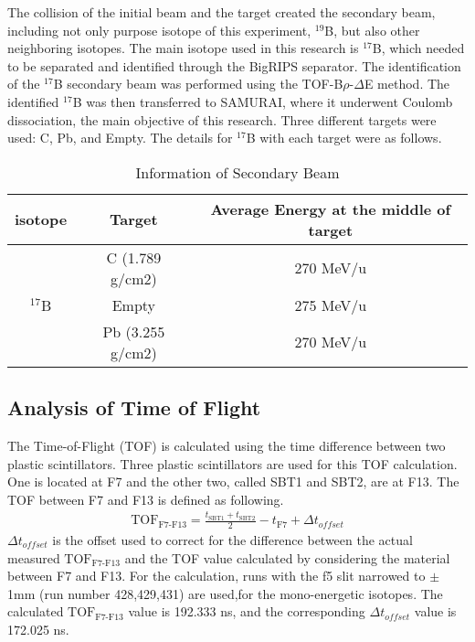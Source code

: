     \indent The collision of the initial beam and the target created the secondary beam, including not only purpose isotope of this experiment, ${}^{19}$B, but also other neighboring isotopes. The main isotope used in this research is ${}^{17}$B, which needed to be separated and identified through the BigRIPS separator. The identification of the ${}^{17}$B secondary beam was performed using the TOF-B$\rho$-$\Delta$E method. The identified ${}^{17}$B was then transferred to SAMURAI, where it underwent Coulomb dissociation, the main objective of this research. Three different targets were used: C, Pb, and Empty. The details for ${}^{17}$B with each target were as follows.

    \begin{table}[ht]
        \centering
        \begin{tabular}[ht]{c|c|c}
            \hline
            isotope & Target & Average Energy at the middle of target \\
            \hline
            & C (1.789 g/cm2)  & 270 MeV/u\\
            ${}^{17}$B & Empty  & 275 MeV/u\\
            & Pb (3.255 g/cm2) & 270 MeV/u\\
            \hline    
        \end{tabular}
        \caption{Information of Secondary Beam}
    \end{table}


\subsection{Analysis of Time of Flight}
The Time-of-Flight (TOF) is calculated using the time difference between two plastic scintillators. Three plastic scintillators are used for this TOF calculation. One is located at F7 and the other two, called SBT1 and SBT2, are at F13. The TOF between F7 and F13 is defined as following.
    \begin{align}
        \text{TOF}_{\text{F7-F13}} = \frac{t_{\text{SBT1}} + t_{\text{SBT2}}}{2} - t_{\text{F7}} + \Delta t_{offset}
    \end{align}
$\Delta t_{offset}$ is the offset used to correct for the difference between the actual measured $\text{TOF}_{\text{F7-F13}}$ and the TOF value calculated by considering the material between F7 and F13. For the calculation, runs with the f5 slit narrowed to $\pm$ 1mm (run number 428,429,431) are used,for the mono-energetic isotopes. The calculated $\text{TOF}_{\text{F7-F13}}$ value is 192.333 ns, and the corresponding $\Delta t_{offset}$ value is 172.025 ns.

